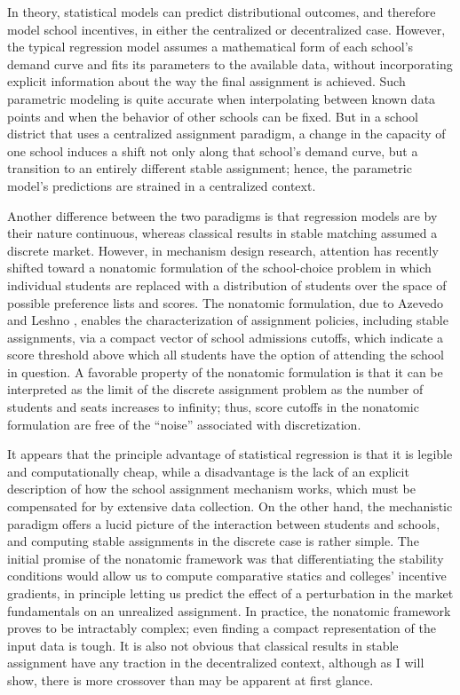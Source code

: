\documentclass[12pt]{article}
\theoremstyle{definition}
\begin{document}
In theory, statistical models can predict distributional outcomes, and therefore model school incentives, in either the centralized or decentralized case. However, the typical regression model assumes a mathematical form of each school's demand curve and fits its parameters to the available data, without incorporating explicit information about the way the final assignment is achieved. Such parametric modeling is quite accurate when interpolating between known data points and when the behavior of other schools can be fixed. But in a school district that uses a centralized assignment paradigm, a change in the capacity of one school induces a shift not only along that school's demand curve, but a transition to an entirely different stable assignment; hence, the parametric model's predictions are strained in a centralized context. 

Another difference between the two paradigms is that regression models are by their nature continuous, whereas classical results in stable matching assumed a discrete market. However, in mechanism design research, attention has recently shifted toward a nonatomic formulation of the school-choice problem in which individual students are replaced with a distribution of students over the space of possible preference lists and scores. The nonatomic formulation, due to Azevedo and Leshno \parencite*{supplydemandfw}, enables the characterization of assignment policies, including stable assignments, via a compact vector of school admissions cutoffs, which indicate a score threshold above which all students have the option of attending the school in question. A favorable property of the nonatomic formulation is that it can be interpreted as the limit of the discrete assignment problem as the number of students and seats increases to infinity; thus, score cutoffs in the nonatomic formulation are free of the ``noise'' associated with discretization. 

It appears that the principle advantage of statistical regression is that it is legible and computationally cheap, while a disadvantage is the lack of an explicit description of how the school assignment mechanism works, which must be compensated for by extensive data collection. On the other hand, the mechanistic paradigm offers a lucid picture of the interaction between students and schools, and computing stable assignments in the discrete case is rather simple. The initial promise of the nonatomic framework was that differentiating the stability conditions would allow us to compute comparative statics and colleges' incentive gradients, in principle letting us predict the effect of a perturbation in the market fundamentals on an unrealized assignment. In practice, the nonatomic framework proves to be intractably complex; even finding a compact representation of the input data is tough. It is also not obvious that classical results in stable assignment have any traction in the decentralized context, although as I will show, there is more crossover than may be apparent at first glance.
\end{document}
